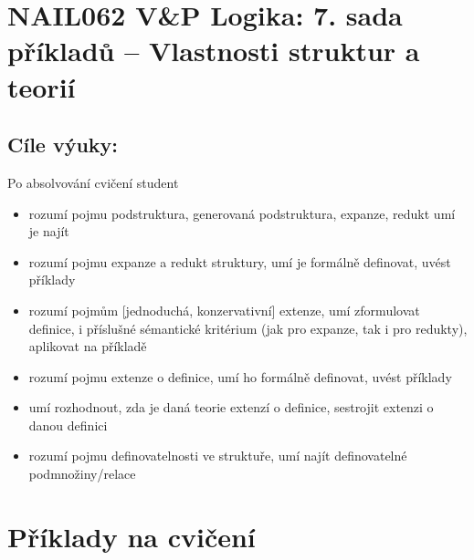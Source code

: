 \section*{NAIL062 V\&P Logika: 7. sada příkladů -- Vlastnosti struktur a teorií}


\subsection*{Cíle výuky:} Po absolvování cvičení student

    \begin{itemize}\setlength{\itemsep}{0pt}
        \item rozumí pojmu podstruktura, generovaná podstruktura, expanze, redukt umí je najít
        \item rozumí pojmu expanze a redukt struktury, umí je formálně definovat, uvést příklady
        \item rozumí pojmům [jednoduchá, konzervativní] extenze, umí zformulovat definice, i příslušné sémantické kritérium (jak pro expanze, tak i pro redukty), aplikovat na příkladě
        \item rozumí pojmu extenze o definice, umí ho formálně definovat, uvést příklady
        \item umí rozhodnout, zda je daná teorie extenzí o definice, sestrojit extenzi o danou definici
        \item rozumí pojmu definovatelnosti ve struktuře, umí najít definovatelné podmnožiny/relace
    \end{itemize}
    

\section*{Příklady na cvičení}


